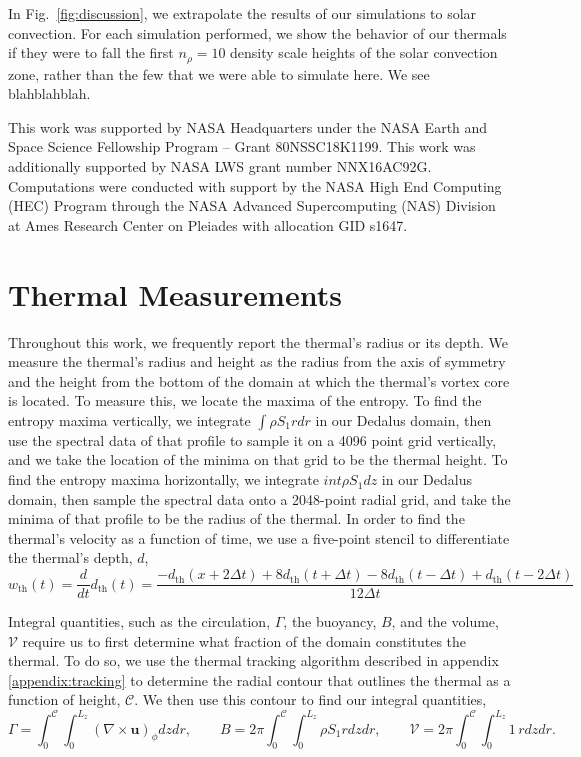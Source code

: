 \documentclass[twocolumn, amsmath, amsfonts, amssymb, trackchanges]{aastex62}
\newcommand{\grad}{\ensuremath{\nabla}}
\begin{document}
In Fig.~\ref{fig:discussion}, we extrapolate the results of our simulations to solar convection.
For each simulation performed, we show the behavior of our thermals if they were to fall the first $n_\rho = 10$ density scale heights of the solar convection zone, rather than the few that we were able to simulate here.
We see blahblahblah.


\begin{acknowledgements}
This work was supported by NASA Headquarters under the NASA Earth and Space Science Fellowship Program -- Grant 80NSSC18K1199.
This work was additionally supported by  NASA LWS grant number NNX16AC92G.  
Computations were conducted with support by the NASA High End Computing (HEC) Program through the NASA  Advanced Supercomputing (NAS) Division at Ames Research Center on Pleiades with allocation GID s1647.
\end{acknowledgements}

\appendix
\section{Thermal Measurements}
\label{appendix:measurements}
Throughout this work, we frequently report the thermal's radius or its depth.
We measure the thermal's radius and height as the radius from the axis of symmetry and the height from the bottom of the domain at which the thermal's vortex core is located.
To measure this, we locate the maxima of the entropy.
To find the entropy maxima vertically, we integrate $\int\rho S_1 r dr$ in our Dedalus domain, then use the spectral data of that profile to sample it on a 4096 point grid vertically, and we take the location of the minima on that grid to be the thermal height.
To find the entropy maxima horizontally, we integrate $int \rho S_1 dz$ in our Dedalus domain, then sample the spectral data onto a 2048-point radial grid, and take the minima of that profile to be the radius of the thermal.
In order to find the thermal's velocity as a function of time, we use a five-point stencil to differentiate the thermal's depth, $d$,
$$
w_{\text{th}}(t) = \frac{d }{dt}d_{\text{th}}(t) = \frac{-d_{\text{th}}(x + 2\Delta t) + 8d_{\text{th}}(t + \Delta t) - 8 d_{\text{th}}(t - \Delta t) + d_{\text{th}}(t - 2\Delta t)}{12\Delta t}
$$

Integral quantities, such as the circulation, $\Gamma$, the buoyancy, $B$, and the volume, $\mathcal{V}$ require us to first determine what fraction of the domain constitutes the thermal.
To do so, we use the thermal tracking algorithm described in appendix \ref{appendix:tracking} to determine the radial contour that outlines the thermal as a function of height, $\mathcal{C}$.
We then use this contour to find our integral quantities,
\begin{equation}
\Gamma = \int_0^{\mathcal{C}}\int_0^{L_z} (\grad\times\bm{u})_\phi dz dr, \qquad
B      = 2\pi \int_0^{\mathcal{C}}\int_0^{L_z} \rho S_1 r dz dr, \qquad
\mathcal{V} = 2\pi \int_0^{\mathcal{C}}\int_0^{L_z} 1\,r dz dr.
\end{equation}
\end{document}
